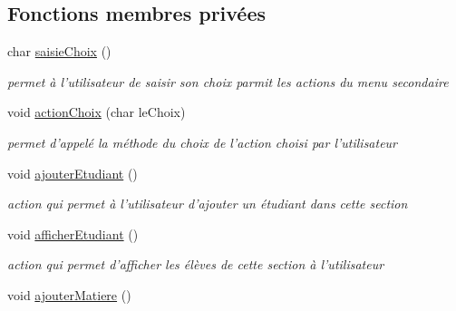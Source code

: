 \subsection*{Fonctions membres privées}
\begin{DoxyCompactItemize}
\item 
\hypertarget{class_section_a5f31422e8e43cf164de5ca56ba979f4a}{char \hyperlink{class_section_a5f31422e8e43cf164de5ca56ba979f4a}{saisie\+Choix} ()}\label{class_section_a5f31422e8e43cf164de5ca56ba979f4a}

\begin{DoxyCompactList}\small\item\em permet à l'utilisateur de saisir son choix parmit les actions du menu secondaire \end{DoxyCompactList}\item 
\hypertarget{class_section_aadf34655598195fa171b2c5a6f50a9c7}{void \hyperlink{class_section_aadf34655598195fa171b2c5a6f50a9c7}{action\+Choix} (char le\+Choix)}\label{class_section_aadf34655598195fa171b2c5a6f50a9c7}

\begin{DoxyCompactList}\small\item\em permet d'appelé la méthode du choix de l'action choisi par l'utilisateur \end{DoxyCompactList}\item 
\hypertarget{class_section_aca817449026803dfddfe01fb76b2a4d6}{void \hyperlink{class_section_aca817449026803dfddfe01fb76b2a4d6}{ajouter\+Etudiant} ()}\label{class_section_aca817449026803dfddfe01fb76b2a4d6}

\begin{DoxyCompactList}\small\item\em action qui permet à l'utilisateur d'ajouter un étudiant dans cette section \end{DoxyCompactList}\item 
\hypertarget{class_section_a762dcfde40a8821f21324d1ade96999b}{void \hyperlink{class_section_a762dcfde40a8821f21324d1ade96999b}{afficher\+Etudiant} ()}\label{class_section_a762dcfde40a8821f21324d1ade96999b}

\begin{DoxyCompactList}\small\item\em action qui permet d'afficher les élèves de cette section à l'utilisateur \end{DoxyCompactList}\item 
\hypertarget{class_section_af834dd53f188641f0b1cc24d7d18e919}{void \hyperlink{class_section_af834dd53f188641f0b1cc24d7d18e919}{ajouter\+Matiere} ()}\label{class_section_af834dd53f188641f0b1cc24d7d18e919}


\end{DoxyCompactItemize}
